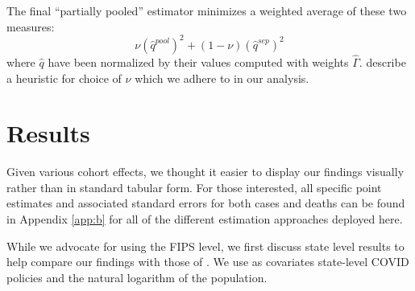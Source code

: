 \documentclass[12pt]{amsart}
\begin{document}
The final ``partially pooled'' estimator minimizes a weighted average of these two measures:
\begin{equation}
    \nu (\hat{q}^{pool})^2 + (1-\nu)(\hat{q}^{sep})^2
\end{equation}
where $\hat{q}$ have been normalized by their values computed with weights $\hat{\Gamma}$.  describe a heuristic for choice of $\nu$ which we adhere to in our analysis.

\section{Results}


Given various cohort effects, we thought it easier to display our findings visually rather than in standard tabular form. For those interested, all specific point estimates and associated standard errors for both cases and deaths can be found in Appendix \ref{app:b} for all of the different estimation approaches deployed here. 

While we advocate for using the FIPS level, we first discuss state level results to help compare our findings with those of . We use as covariates state-level COVID policies and the natural logarithm of the population. 

\end{document}
